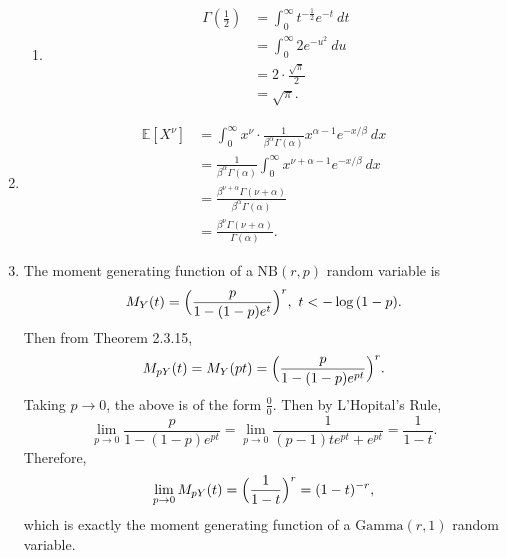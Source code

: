 \documentclass{article}
\begin{document}
\begin{enumerate}
\begin{enumerate}
        \item \begin{align*}
            \Gamma(\frac{1}{2})
            &= \int_{0}^{\infty} t^{-\frac{1}{2}} e^{-t} \ dt \\
            &= \int_{0}^{\infty} 2e^{-u^2} \ du \\
            &= 2 \cdot \frac{\sqrt{\pi}}{2} \\
            &= \sqrt{\pi}.
        \end{align*}
    \end{enumerate}

    \item \begin{align*}
        \mathbb{E}[X^{\nu}]
        &= \int_{0}^{\infty} x^{\nu} \cdot \frac{1}{\beta^{\alpha} \Gamma(\alpha)} 
        x^{\alpha - 1} e^{-x/\beta} \ dx \\
        &= \frac{1}{\beta^{\alpha} \Gamma(\alpha)} \int_{0}^{\infty} 
        x^{\nu + \alpha - 1} e^{-x/\beta} \ dx \\
        &= \frac{\beta^{\nu + \alpha} \Gamma(\nu + \alpha)}{\beta^{\alpha} \Gamma(\alpha)} \\
        &= \frac{\beta^{\nu} \Gamma(\nu + \alpha)}{\Gamma(\alpha)}.
    \end{align*}

    \item The moment generating function of a $\text{NB}(r, p)$ random variable is 
    \[ M_{Y}(t) = \Bigl( \frac{p}{1 - (1 - p)e^{t}} \Bigr)^{r}, \ t < -\log{(1 - p)}. \]
    Then from Theorem 2.3.15, 
    \[ M_{pY}(t) = M_{Y}(pt) = \Bigl( \frac{p}{1 - (1 - p)e^{pt}} \Bigr)^{r}. \]
    Taking $p \to 0$, the above is of the form $\frac{0}{0}$. Then by L'Hopital's Rule, 
    \[ \lim_{p \to 0} \frac{p}{1 - (1 - p)e^{pt}} 
    = \lim_{p \to 0} \frac{1}{(p - 1)te^{pt} + e^{pt}} = \frac{1}{1 - t}. \]
    Therefore, 
    \[ \lim_{p \to 0} M_{pY}(t) = \Bigl( \frac{1}{1 - t} \Bigr)^{r} = (1 - t)^{-r}, \]
    which is exactly the moment generating function of a $\text{Gamma}(r, 1)$ random variable.

\end{enumerate}
\end{document}
